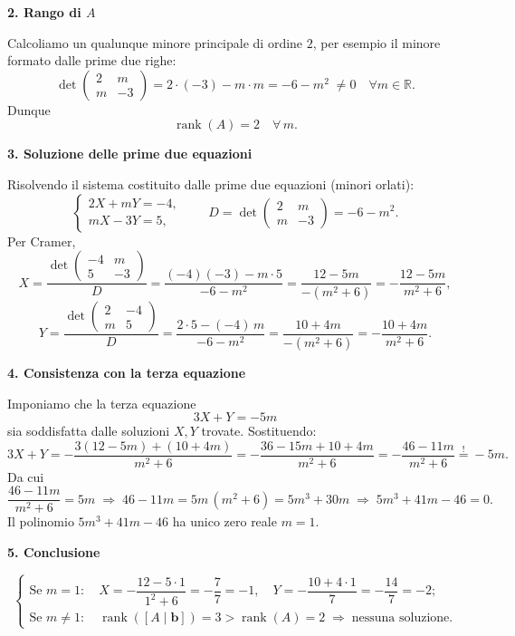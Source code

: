\documentclass{article}
\theoremstyle{plain}
\theoremstyle{definition}
\theoremstyle{remark}
\begin{document}
\begin{enumerate}
\bigskip
\textbf{2. Rango di \(A\)}

Calcoliamo un qualunque minore principale di ordine \(2\), per esempio il minore formato dalle prime due righe:
\[
\det\begin{pmatrix}
2 & m\\
m & -3
\end{pmatrix}
=2\cdot(-3) - m\cdot m = -6 - m^2 \;\neq0\quad\forall m\in\mathbb R.
\]
Dunque
\[
\operatorname{rank}(A) = 2\quad\forall\,m.
\]

\bigskip
\textbf{3. Soluzione delle prime due equazioni}

Risolvendo il sistema costituito dalle prime due equazioni (minori orlati):
\[
\begin{cases}
2X + mY = -4,\\
mX - 3Y = 5,
\end{cases}
\qquad
D = \det\begin{pmatrix}2 & m\\ m & -3\end{pmatrix} = -6 - m^2.
\]
Per Cramer,
\[
X = \frac{\det\begin{pmatrix}-4 & m\\ 5 & -3\end{pmatrix}}{D}
= \frac{(-4)(-3) - m\cdot5}{-6 - m^2}
= \frac{12 - 5m}{-(m^2 + 6)}
= -\frac{12 - 5m}{m^2 + 6},
\]
\[
Y = \frac{\det\begin{pmatrix}2 & -4\\ m & 5\end{pmatrix}}{D}
= \frac{2\cdot5 - (-4)\,m}{-6 - m^2}
= \frac{10 + 4m}{-(m^2 + 6)}
= -\frac{10 + 4m}{m^2 + 6}.
\]

\bigskip
\textbf{4. Consistenza con la terza equazione}

Imponiamo che la terza equazione
\[
3X + Y = -5m
\]
sia soddisfatta dalle soluzioni \(X,Y\) trovate. Sostituendo:
\[
3X + Y
= -\frac{3(12 - 5m) + (10 + 4m)}{m^2 + 6}
= -\frac{36 - 15m + 10 + 4m}{m^2 + 6}
= -\frac{46 - 11m}{m^2 + 6}
\stackrel{!}{=} -5m.
\]
Da cui
\[
\frac{46 - 11m}{m^2 + 6} = 5m
\;\Longrightarrow\;
46 - 11m = 5m\,(m^2 + 6)
= 5m^3 + 30m
\;\Longrightarrow\;
5m^3 + 41m - 46 = 0.
\]
Il polinomio \(5m^3 + 41m - 46\) ha unico zero reale \(m=1\).  

\bigskip
\textbf{5. Conclusione}

\[
\begin{cases}
\text{Se }m = 1:\quad
X = -\dfrac{12 - 5\cdot1}{1^2 + 6} = -\dfrac{7}{7} = -1,\quad
Y = -\dfrac{10 + 4\cdot1}{7} = -\dfrac{14}{7} = -2;\\[6pt]
\text{Se }m \neq 1:\quad
\operatorname{rank}([A\mid\mathbf b]) = 3 > \operatorname{rank}(A) = 2
\;\Longrightarrow\;
\text{nessuna soluzione.}
\end{cases}
\]
\end{enumerate}
\end{document}
